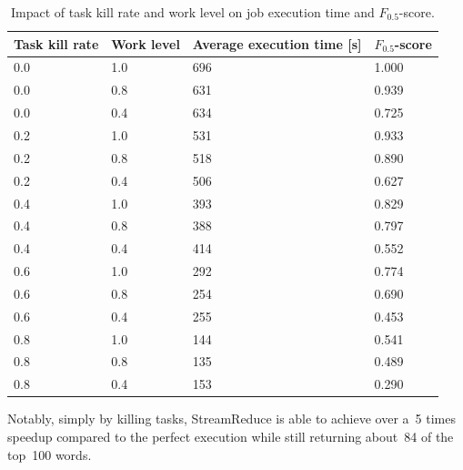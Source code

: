 \documentclass[12pt,twocolumn]{article}
\begin{document}
\begin{table}
\begin{tabularx}{\linewidth}{|X|X|X|X|}
\hline
Task kill rate & Work level & Average execution time [s] & $F_{0.5}$-score \\ \hline\hline
0.0 & 1.0 & 696 & 1.000 \\ \hline
0.0 & 0.8 & 631 & 0.939 \\ \hline
0.0 & 0.4 & 634 & 0.725 \\ \hline\hline
0.2 & 1.0 & 531 & 0.933 \\ \hline
0.2 & 0.8 & 518 & 0.890 \\ \hline
0.2 & 0.4 & 506 & 0.627 \\ \hline\hline
0.4 & 1.0 & 393 & 0.829 \\ \hline
0.4 & 0.8 & 388 & 0.797 \\ \hline
0.4 & 0.4 & 414 & 0.552 \\ \hline\hline
0.6 & 1.0 & 292 & 0.774 \\ \hline
0.6 & 0.8 & 254 & 0.690 \\ \hline
0.6 & 0.4 & 255 & 0.453 \\ \hline\hline
0.8 & 1.0 & 144 & 0.541 \\ \hline
0.8 & 0.8 & 135 & 0.489 \\ \hline
0.8 & 0.4 & 153 & 0.290 \\ \hline
\end{tabularx}
\caption{Impact of task kill rate and work level on job execution time and $F_{0.5}$-score.}
\label{table:runtime}
\end{table}

Notably, simply by killing tasks, StreamReduce is able to achieve over a~5 times speedup
compared
to the perfect execution while still returning about~84 of the top~100 words.
\end{document}
